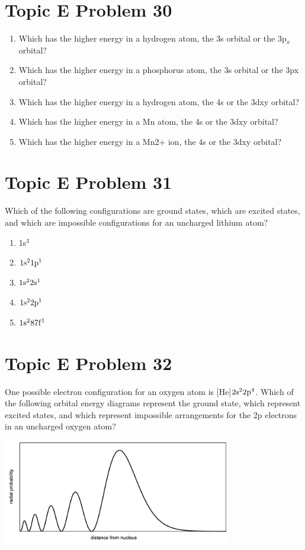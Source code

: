 \documentclass[10pt]{article}
\begin{document}
    \pagebreak
    \section{Topic E Problem 30}
        \begin{enumerate}[label=\alph*)]
            \item   Which has the higher energy in a hydrogen atom, the 3s orbital or the 3p$_x$ orbital?
            \item   Which has the higher energy in a phosphorus atom, the 3s orbital or the 3px orbital?
            \item   Which has the higher energy in a hydrogen atom, the 4s or the 3dxy orbital?
            \item   Which has the higher energy in a Mn atom, the 4s or the 3dxy orbital?
            \item   Which has the higher energy in a Mn2+ ion, the 4s or the 3dxy orbital?
        \end{enumerate}

    \pagebreak
    \section{Topic E Problem 31}
        Which of the following configurations are ground states, which are excited states, and which are impossible configurations for an uncharged lithium atom?
        \begin{multicols}{3}
            \begin{enumerate}
                \item   1s$^3$
                \item   $\rm 1s^2 1p^1$
                \item   $\rm 1s^2 2s^1$
                \item   $\rm 1s^2 2p^1$
                \item   $\rm 1s^2 87f^1$
            \end{enumerate}
        \end{multicols}


    \pagebreak
    \section{Topic E Problem 32}
        One possible electron configuration for an oxygen atom is [He]$\rm 2s^2 2p^4$. 
        Which of the following orbital energy diagrams represent the ground state, which represent excited states, and which represent impossible arrangements for the 2p electrons in an uncharged oxygen atom?
        \begin{center}
            \includegraphics[width=0.75\textwidth]{img-E26.png}
        \end{center}    
\end{document}
